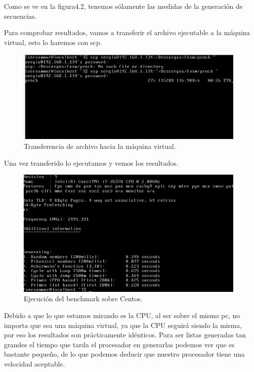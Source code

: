 Como se ve en la figura4.2, tenemos sólamente las medidas de la generación de secuencias.

Para comprobar resultados, vamos a transferir el archivo ejecutable a la máquina virtual, esto lo haremos con scp.

\begin{figure}[H] %
	\centering
	\includegraphics[scale=0.5]{imagenes/pasar-archivo.png}  %
	\caption{Transferencia de archivo hacia la máquina virtual.}
\end{figure}

Una vez transferido lo ejecutamos y vemos los resultados.

\begin{figure}[H] %
	\centering
	\includegraphics[scale=0.5]{imagenes/procb-centos.png}  %
	\caption{Ejecución del benchmark sobre Centos.}
\end{figure}


Debido a que lo que estamos mirando es la CPU, al ser sobre el mismo pc, no importa que sea una máquina virtual, ya que la CPU seguirá siendo la misma, por eso los resultados son prácticamente idénticos.
Para ser listas generadas tan grandes el tiempo que tarda el procesador en generarlas podemos ver que es bastante pequeño, de lo que podemos deducir que nuestro procesador tiene una velocidad aceptable.


\newpage


